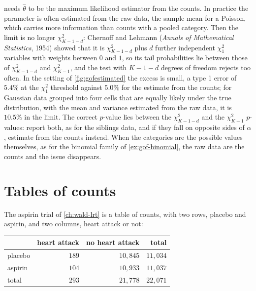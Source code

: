 \begin{pitfall}
 needs $\hat{\theta}$ to be the maximum likelihood estimator from the counts.
In practice the parameter is often estimated from the raw data, the sample mean for a Poisson, which carries more information than counts with a pooled category.
Then the limit is no longer $\chi^2_{K-1-d}$: Chernoff and Lehmann (\textit{Annals of Mathematical Statistics}, 1954) showed that it is $\chi^2_{K-1-d}$ plus $d$ further independent $\chi^2_1$ variables with weights between $0$ and $1$, so its tail probabilities lie between those of $\chi^2_{K-1-d}$ and $\chi^2_{K-1}$, and the test with $K - 1 - d$ degrees of freedom rejects too often.
In the setting of \cref{fig:gofestimated} the excess is small, a type 1 error of $5.4\%$ at the $\chi^2_1$ threshold against $5.0\%$ for the estimate from the counts; for Gaussian data grouped into four cells that are equally likely under the true distribution, with the mean and variance estimated from the raw data, it is $10.5\%$ in the limit.
The correct $p$-value lies between the $\chi^2_{K-1-d}$ and the $\chi^2_{K-1}$ $p$-values: report both, as for the siblings data, and if they fall on opposite sides of $\alpha$, estimate from the counts instead.
When the categories are the possible values themselves, as for the binomial family of \cref{ex:gof-binomial}, the raw data are the counts and the issue disappears.
\end{pitfall}

\section{Tables of counts}
\label{sec:gof-tables}

The aspirin trial of \cref{ch:wald-lrt} is a table of counts, with two rows, placebo and aspirin, and two columns, heart attack or not:

\begin{center}
\small
\begin{tabular}{@{}lrrr@{}}
\toprule
 & heart attack & no heart attack & total \\
\midrule
placebo & $189$ & $10{,}845$ & $11{,}034$ \\
aspirin & $104$ & $10{,}933$ & $11{,}037$ \\
total & $293$ & $21{,}778$ & $22{,}071$ \\
\bottomrule
\end{tabular}
\end{center}

